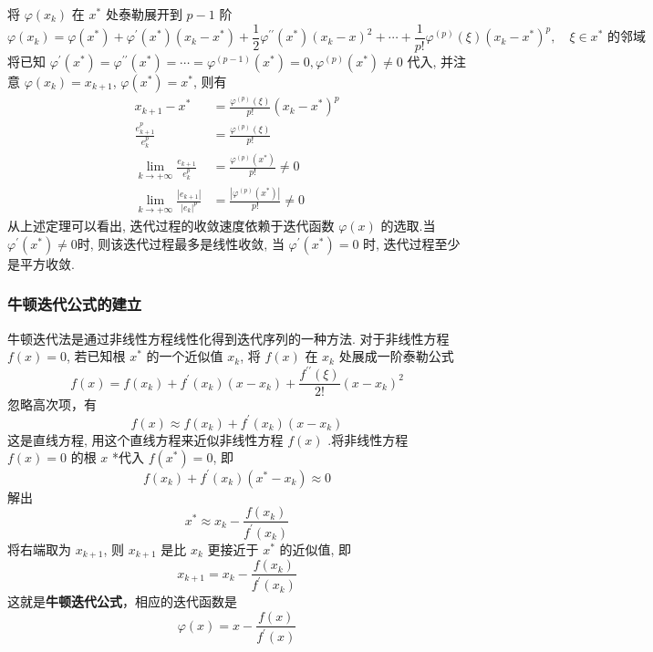 将 $ \varphi\left(x_{k}\right) $ 在 $ x^{*} $ 处泰勒展开到 $ p-1 $ 阶
$$
\varphi\left(x_{k}\right)=\varphi\left(x^{*}\right)+\varphi^{\prime}\left(x^{*}\right)\left(x_{k}-x^{*}\right)+\frac{1}{2} \varphi^{\prime \prime}\left(x^{*}\right)\left(x_{k}-x\right)^{2}+ \cdots+\frac{1}{p!} \varphi^{(p)}(\xi)\left(x_{k}-x^{*}\right)^{p}, \quad \xi \in x^{*} \text { 的邻域 }
$$
将已知 $ \varphi^{\prime}\left(x^{*}\right)=\varphi^{\prime \prime}\left(x^{*}\right)=\cdots=\varphi^{(p-1)}\left(x^{*}\right)=0, \varphi^{(p)}\left(x^{*}\right) \neq 0 $ 代入, 并注意 $ \varphi\left(x_{k}\right)=x_{k+1} $, $ \varphi\left(x^{*}\right)=x^{*} $, 则有
$$
\begin{aligned}
x_{k+1}-x^{*}&=\frac{\varphi^{(p)}(\xi)}{p!}\left(x_{k}-x^{*}\right)^{p} \\
\frac{e_{k+1}^{p}}{e_{k}^{p}}&=\frac{\varphi^{(p)}(\xi)}{p!} \\
\lim _{k \rightarrow+\infty} \frac{e_{k+1}}{e_{k}^{p}}&=\frac{\varphi^{(p)}\left(x^{*}\right)}{p!} \neq 0 \\
\lim _{k \rightarrow+\infty} \frac{\left|e_{k+1}\right|}{\left|e_{k}\right|^{p}}&=\frac{\left|\varphi^{(p)}\left(x^{*}\right)\right|}{p!} \neq 0
\end{aligned}
$$
从上述定理可以看出, 迭代过程的收敛速度依赖于迭代函数 $ \varphi(x) $ 的选取.当 $ \varphi^{\prime}\left(x^{*}\right) \neq 0 $时, 则该迭代过程最多是线性收敛, 当 $ \varphi^{\prime}\left(x^{*}\right)=0 $ 时, 迭代过程至少是平方收敛.


\subsubsection{牛顿迭代公式的建立}
牛顿迭代法是通过非线性方程线性化得到迭代序列的一种方法.
对于非线性方程 $ f(x)=0 $, 若已知根 $ x^{*} $ 的一个近似值 $ x_{k} $, 将 $ f(x) $ 在 $ x_{k} $ 处展成一阶泰勒公式
$$
f(x)=f\left(x_{k}\right)+f^{\prime}\left(x_{k}\right)\left(x-x_{k}\right)+\frac{f^{\prime \prime}(\xi)}{2!}\left(x-x_{k}\right)^{2}
$$
忽略高次项，有
$$
f(x) \approx f\left(x_{k}\right)+f^{\prime}\left(x_{k}\right)\left(x-x_{k}\right)
$$
这是直线方程, 用这个直线方程来近似非线性方程 $ f(x) $ .将非线性方程 $ f(x)=0 $ 的根 $ x $ *代入 $ f\left(x^{*}\right)=0 $, 即
$$
f\left(x_{k}\right)+f^{\prime}\left(x_{k}\right)\left(x^{*}-x_{k}\right) \approx 0
$$
解出
$$
x^{*} \approx x_{k}-\frac{f\left(x_{k}\right)}{f^{\prime}\left(x_{k}\right)}
$$
将右端取为 $ x_{k+1} $, 则 $ x_{k+1} $ 是比 $ x_{k} $ 更接近于 $ x^{*} $ 的近似值, 即
$$
x_{k+1}=x_{k}-\frac{f\left(x_{k}\right)}{f^{\prime}\left(x_{k}\right)}
$$
这就是\textbf{牛顿迭代公式}，相应的迭代函数是
$$
\varphi(x)=x-\frac{f(x)}{f^{\prime}(x)}
$$

